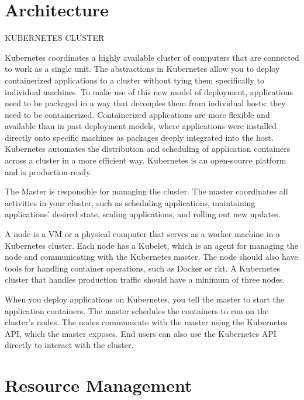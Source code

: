 \section{Architecture}
\label{sec:kubernetes-architecture}

KUBERNETES CLUSTER

Kubernetes coordinates a highly available cluster of computers that are connected to work as a single unit. The abstractions in Kubernetes allow you to deploy containerized applications to a cluster without tying them specifically to individual machines. To make use of this new model of deployment, applications need to be packaged in a way that decouples them from individual hosts: they need to be containerized. Containerized applications are more flexible and available than in past deployment models, where applications were installed directly onto specific machines as packages deeply integrated into the host. Kubernetes automates the distribution and scheduling of application containers across a cluster in a more efficient way. Kubernetes is an open-source platform and is production-ready.

The Master is responsible for managing the cluster. The master coordinates all activities in your cluster, such as scheduling applications, maintaining applications' desired state, scaling applications, and rolling out new updates.

A node is a VM or a physical computer that serves as a worker machine in a Kubernetes cluster. Each node has a Kubelet, which is an agent for managing the node and communicating with the Kubernetes master. The node should also have tools for handling container operations, such as Docker or rkt. A Kubernetes cluster that handles production traffic should have a minimum of three nodes.

When you deploy applications on Kubernetes, you tell the master to start the application containers. The master schedules the containers to run on the cluster's nodes. The nodes communicate with the master using the Kubernetes API, which the master exposes. End users can also use the Kubernetes API directly to interact with the cluster.




\section{Resource Management}
\label{sec:kubernetes-resource-management}


